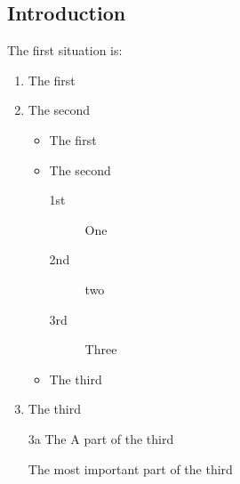 \documentclass{article}
\begin{document}
        \subsection{Introduction}
            The first situation is: 
            \begin{enumerate}                                           %
                \item The first
                \item The second
                \begin{itemize}                                         %
                    \item The first
                    \item The second
                    \begin{description}                                 %
                        \item[1st] One
                        \item[2nd] two
                        \item[3rd] Three
                    \end{description}
                    \item The third
                \end{itemize}
                \item The third
                \item[3a] The A part of the third                       %
                \item[\dag] The most important part of the third        %
            \end{enumerate}
        
\end{document}
